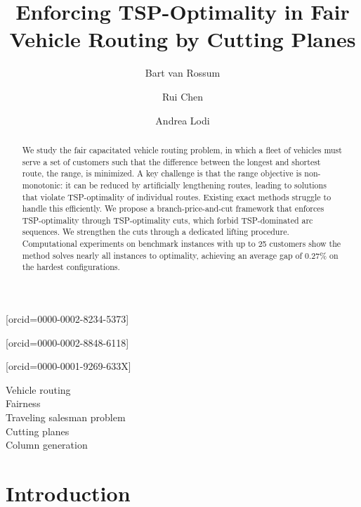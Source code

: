 \documentclass[a4paper,fleqn]{cas-dc}%
\begin{document}
\let\WriteBookmarks\relax
\def\floatpagepagefraction{1}
\def\textpagefraction{.001}

\title [mode = title]{Enforcing TSP-Optimality in Fair Vehicle Routing by Cutting Planes}
\author[1]{Bart {van Rossum}}[orcid=0000-0002-8234-5373]
\address[1]{Operations, Planning, Accounting \& Control, Eindhoven University of Technology, Eindhoven, The Netherlands}
\author[2]{Rui Chen}[orcid=0000-0002-8848-6118]
\address[2]{School of Data Science, The Chinese University of Hong Kong, Shenzhen, Guangdong, China}
\author[3]{Andrea Lodi}[orcid=0000-0001-9269-633X]
\address[3]{Cornell Tech, New York City, NY, USA}


\begin{abstract}
\noindent 
We study the fair capacitated vehicle routing problem, in which a fleet of vehicles must serve a set of customers such that the difference between the longest and shortest route, the range, is minimized. A key challenge is that the range objective is non-monotonic: it can be reduced by artificially lengthening routes, leading to solutions that violate TSP-optimality of individual routes. Existing exact methods struggle to handle this efficiently. We propose a branch-price-and-cut framework that enforces TSP-optimality through TSP-optimality cuts, which forbid TSP-dominated arc sequences. We strengthen the cuts through a dedicated lifting procedure. Computational experiments on benchmark instances with up to 25 customers show the method solves nearly all instances to optimality, achieving an average gap of 0.27\% on the hardest configurations.
\end{abstract}

\begin{keywords}
Vehicle routing \\ Fairness \\ Traveling salesman problem \\ Cutting planes \\ Column generation
\end{keywords}

\maketitle

\section{Introduction}
\label{sec:intro}
\end{document}
